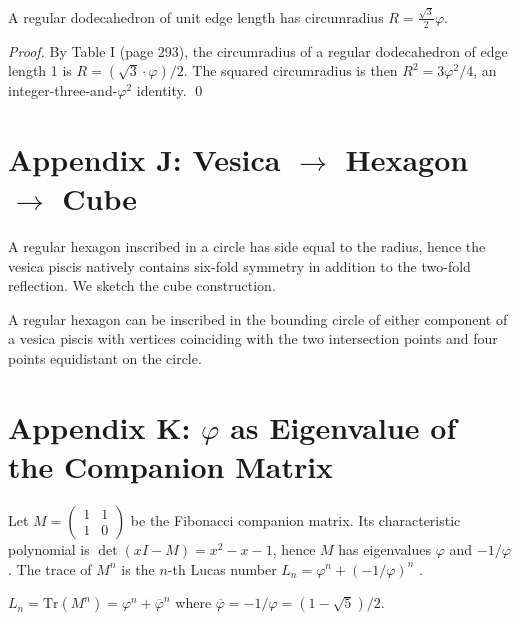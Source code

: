 \begin{theorem}\label{fa_01:thm:01-dodec-circ}
A regular dodecahedron of unit edge length has circumradius
$R = \frac{\sqrt 3}{2} \varphi$.
\end{theorem}

\begin{proof}
By \cite{coxeter_regular_polytopes} Table I (page 293), the
circumradius of a regular dodecahedron of edge length 1 is
$R = (\sqrt 3 \cdot \varphi)/2$. The squared circumradius is then
$R^2 = 3 \varphi^2 /4$, an integer-three-and-$\varphi^2$ identity.
\qed
\end{proof}

\section*{Appendix J: Vesica $\to$ Hexagon $\to$ Cube}
\label{fa_01:sec:01-app-J}

A regular hexagon inscribed in a circle has side equal to the
radius, hence the vesica piscis natively contains six-fold symmetry
in addition to the two-fold reflection. We sketch the cube
construction.

\begin{lemma}\label{fa_01:lem:01-hex-vesica}
A regular hexagon can be inscribed in the bounding circle of either
component of a vesica piscis with vertices coinciding with the two
intersection points and four points equidistant on the circle.
\end{lemma}

\section*{Appendix K: $\varphi$ as Eigenvalue of the Companion Matrix}
\label{fa_01:sec:01-app-K}

Let $M = \begin{pmatrix} 1 & 1 \\ 1 & 0 \end{pmatrix}$ be the
Fibonacci companion matrix. Its characteristic polynomial is
$\det(xI - M) = x^2 - x - 1$, hence $M$ has eigenvalues $\varphi$ and
$-1/\varphi$. The trace of $M^n$ is the $n$-th Lucas number $L_n =
\varphi^n + (-1/\varphi)^n$ \cite{koshy_fib_lucas}.

\begin{theorem}\label{fa_01:thm:01-lucas-as-trace}
$L_n = \mathrm{Tr}(M^n) = \varphi^n + \overline{\varphi}^n$ where
$\overline{\varphi} = -1/\varphi = (1 - \sqrt 5)/2$.
\end{theorem}

